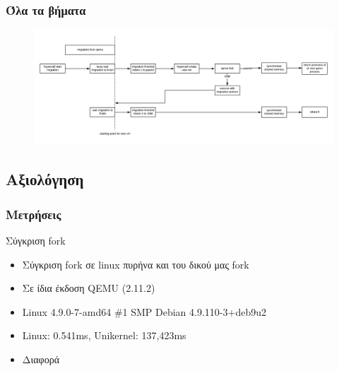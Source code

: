 \documentclass[red,slidestop,notes,compress,mathserif]{beamer}
\begin{document}

\begin{frame}
\frametitle{Όλα τα βήματα}
\begin{figure}
\center
\includegraphics[scale=0.4]{figures/fork_timeline.png}
\end{figure}
\end{frame}

\subsection{Αξιολόγηση}
\begin{frame}
\frametitle{Μετρήσεις}
\begin{block}{Σύγκριση fork}
\begin{itemize}
\item Σύγκριση fork σε linux πυρήνα και του δικού μας fork 
\item Σε ίδια έκδοση QEMU (2.11.2)
\item Linux 4.9.0-7-amd64 \#1 SMP Debian 4.9.110-3+deb9u2
\item Linux: 0.541ms, Unikernel: 137,423ms
\item Διαφορά
\end{itemize}
\end{block}
\end{frame}
\end{document}
